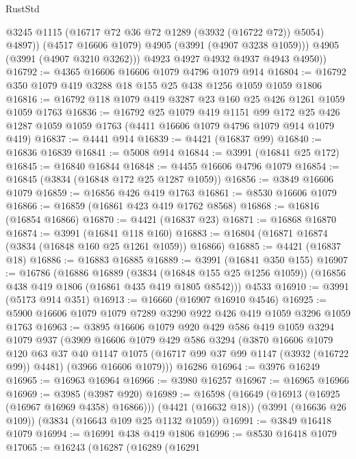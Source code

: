 \begin{lexlean}{RustStd}
\begin{coremodule}
                @3245
                @1115
                (@16717 @72 @36 @72 @1289 (@3932 (@16722 @72)) @5054)
                @4897))
            (@4517 @16606 @1079)
            @4905
            (@3991 (@4907 @3238 @1059)))
          @4905
          (@3991 (@4907 @3210 @3262)))
        @4923
        @4927
        @4932
        @4937
        @4943
        @4950))
@16792 := @4365 @16606 @16606 @1079 @4796 @1079 @914
@16804 := @16792 @350 @1079 @419 @3288 @18 @155 @25 @438 @1256 @1059 @1059 @1806
@16816 := @16792 @118 @1079 @419 @3287 @23 @160 @25 @426 @1261 @1059 @1059 @1763
@16836 := @16792
    @25
    @1079
    @419
    @1151
    @99
    @172
    @25
    @426
    @1287
    @1059
    @1059
    @1763
    (@4411 @16606 @1079 @4796 @1079 @914 @1079 @419)
@16837 := @4441 @914
@16839 := @4421 (@16837 @99)
@16840 := @16836 @16839
@16841 := @5008 @914
@16844 := @3991 (@16841 @25 @172)
@16845 := @16840 @16844
@16848 := @4455 @16606 @4796 @1079
@16854 := @16845 (@3834 (@16848 @172 @25 @1287 @1059))
@16856 := @3849 @16606 @1079
@16859 := @16856 @426 @419 @1763
@16861 := @8530 @16606 @1079
@16866 := @16859 (@16861 @423 @419 @1762 @8568)
@16868 := @16816 (@16854 @16866)
@16870 := @4421 (@16837 @23)
@16871 := @16868 @16870
@16874 := @3991 (@16841 @118 @160)
@16883 := @16804 (@16871 @16874 (@3834 (@16848 @160 @25 @1261 @1059)) @16866)
@16885 := @4421 (@16837 @18)
@16886 := @16883 @16885
@16889 := @3991 (@16841 @350 @155)
@16907 := @16786
    (@16886
      @16889
      (@3834 (@16848 @155 @25 @1256 @1059))
      (@16856 @438 @419 @1806 (@16861 @435 @419 @1805 @8542)))
    @4533
@16910 := @3991 (@5173 @914 @351)
@16913 := @16660 (@16907 @16910 @4546)
@16925 := @5900 @16606 @1079 @1079 @7289 @3290 @922 @426 @419 @1059 @3296 @1059 @1763
@16963 := @3895
    @16606
    @1079
    @920
    @429
    @586
    @419
    @1059
    @3294
    @1079
    @937
    (@3909
      @16606
      @1079
      @429
      @586
      @3294
      (@3870
        @16606
        @1079
        @120
        @63
        @37
        @40
        @1147
        @1075
        (@16717 @99 @37 @99 @1147 (@3932 (@16722 @99)) @4481)
        (@3966 @16606 @1079)))
    @16286
@16964 := @3976 @16249
@16965 := @16963 @16964
@16966 := @3980 @16257
@16967 := @16965 @16966
@16969 := @3985 (@3987 @920)
@16989 := @16598
    (@16649 (@16913 (@16925 (@16967 @16969 @4358) @16866)))
    (@4421 (@16632 @18))
    (@3991 (@16636 @26 @109))
    (@3834 (@16643 @109 @25 @1132 @1059))
@16991 := @3849 @16418 @1079
@16994 := @16991 @438 @419 @1806
@16996 := @8530 @16418 @1079
@17065 := @16243
    (@16287
      (@16289
        (@16291

\end{coremodule}
\end{lexlean}
